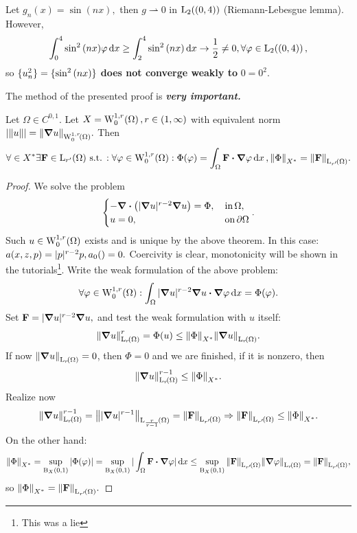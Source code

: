 \documentclass{article}
\begin{document}
\begin{example}
	Let $g_n(x) = \sin(nx), $ then $g \rightharpoonup 0$ in $\LpSet[2]{(0,4)}$ (Riemann-Lebesgue lemma). However,
	\[
		\int_0^4 \sin^{2}\qty(nx)\varphi \dd{x} \geq \int_2^4 \sin^{2}\qty(nx)\dd{x} \to \frac{1}{2} \neq 0, \forall \varphi \in \LpSet[2]{(0,4)},
	\]
	so $\{u_n^{2}\} = \{\sin^{2}\qty(nx)\}$ \textbf{does not converge weakly to } $0 = 0^{2}$.
\end{example}
\begin{remark}
	The method of the presented proof is \textbf{\textit{very important.}}
\end{remark}
\begin{theorem}
	Let $\Omega \in C^{0,1}.$ Let $X = \WkpzeroSet[1][r]{\Omega}, r \in \qty(1,\infty)$ with equivalent norm $|\norm{u}| = \norm{\grad u}_{\WkpzeroSet[1][r]{\Omega}}.$ Then
	\[
		\forall \in X^{*} \exists \vb{F} \in \LpSet[r']{\Omega} \, \text{s.t.} \,: \forall \varphi \in \WkpzeroSet[1][r]{\Omega}: \Phi(\varphi) = \int_{\Omega}\vb{F} \vdot \grad \varphi\dd{x}, \norm{\Phi}_{X^{*}} = \norm{\vb{F}}_{\LpSet[r']{\Omega}}.
	\]
\end{theorem}
\begin{proof}
	We solve the problem
	\begin{equation}
		\begin{cases}
			- \divergence{\qty(|\grad u|^{r-2}\grad u)} = \Phi, & \, \text{in} \, \Omega, \\
			u = 0, & \, \text{on} \, \partial \Omega
		\end{cases}.
	\end{equation}
	Such $u \in \WkpzeroSet[1][r]{\Omega}$ exists and is unique by the above theorem. In this case: $a\qty(x,z,p) = |p|^{r-2} p, a_0() = 0.$ Coercivity is clear, monotonicity will be shown in the tutorials\footnote{This was a lie}. Write the weak formulation of the above problem:
	\[
		\forall \varphi \in \WkpzeroSet[1][r]{\Omega}: \int_{\Omega}|\grad u|^{r-2} \grad u \vdot \grad \varphi \dd{x} = \Phi\qty(\varphi).
	\]
	Set $\vb{F} = |\grad u|^{r-2} \grad u,$ and test the weak formulation with $u$ itself:
	\[
		\norm{\grad u}_{\LpSet[r]{\Omega}}^r = \Phi(u) \leq \norm{\Phi}_{X^{*}} \norm{\grad u}_{\LpSet[r]{\Omega}}.
	\]
	If now $\norm{\grad u}_{\LpSet[r]{\Omega}} = 0$, then $\Phi = 0$ and we are finished, if it is nonzero, then
	\[
		\norm{\grad u}_{\LpSet[r]{\Omega}}^{r-1} \leq \norm{\Phi}_{X^{*}}.
	\]
	Realize now
	\[
		\norm{\grad u}_{\LpSet[r]{\Omega}}^{r-1} = \norm{| \grad u|^{r-1}}_{\LpSet[\frac{r}{r-1}]{\Omega}} = \norm{\vb{F}}_{\LpSet[r']{\Omega}} \Rightarrow \norm{\vb{F}}_{\LpSet[r']{\Omega}} \leq \norm{\Phi}_{X^{*}}.
	\]
	On the other hand:
	\[
		\norm{\Phi}_{X^{*}} = \sup_{\text{B}_{X}(0,1)} |\Phi(\varphi)| = \sup_{\text{B}_{X}(0,1)} |\int_{\Omega}\vb{F} \vdot \grad \varphi|\dd{x} \leq \sup_{\text{B}_{X}(0,1)} \norm{\vb{F}}_{\LpSet[r']{\Omega}} \norm{\grad \varphi}_{\LpSet[r]{\Omega}} = \norm{\vb{F}}_{\LpSet[r']{\Omega}},
	\]
	so $\norm{\Phi}_{X^{*}} = \norm{\vb{F}}_{\LpSet[r']{\Omega}}.$
\end{proof}
\end{document}
